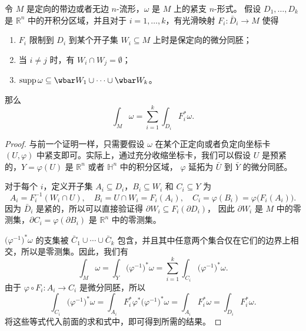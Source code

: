 \begin{proposition}[参数化上的积分]\label{prop:integration on manifold by parametrization}
  令 $M$ 是定向的带边或者无边 $n$-流形，$\omega$ 是 $M$ 上的紧支 $n$-形式。
  假设 $D_1,\dots,D_k$ 是 $\mathbb{R}^n$ 中的开积分区域，并且对于
  $i=1,\dots,k$，有光滑映射 $F_i:\bar D_i\to M$ 使得
  \begin{enumerate}
    \item $F_i$ 限制到 $D_i$ 到某个开子集 $W_i\subseteq M$ 上时是保定向的微分同胚；
    \item 当 $i\neq j$ 时，有 $W_i\cap W_j=\emptyset$；
    \item $\supp\omega\subseteq \wbar W_1\cup\cdots\cup\wbar W_k$。
  \end{enumerate}
  那么
  \begin{equation}
    \int_M\omega=\sum_{i=1}^k \int_{D_i} F_i^*\omega.
  \end{equation}
\end{proposition}
\begin{proof}
  与前一个证明一样，只需要假设 $\omega$ 在某个正定向或者负定向坐标卡
  $(U,\varphi)$ 中紧支即可。实际上，通过充分收缩坐标卡，我们可以假设 $U$
  是预紧的，$Y=\varphi(U)$ 是 $\mathbb{R}^n$ 或者 $\mathbb{H}^n$ 中的积分区域，
  $\varphi$ 延拓为 $\bar U$ 到 $\bar Y$ 的微分同胚。

  对于每个 $i$，定义开子集 $A_i\subseteq D_i$，$B_i\subseteq W_i$ 和 
  $C_i\subseteq Y$ 为 
  \[
    A_i=F_i^{-1}(W_i\cap U),\quad B_i=U\cap W_i=F_i(A_i),
    \quad C_i=\varphi(B_i)=\varphi\bigl(F_i(A_i)\bigr).
  \]
  因为 $\bar D_i$ 是紧的，所以可以直接验证得 $\partial W_i\subseteq F_i(\partial D_i)$，
  因此 $\partial W_i$ 是 $M$ 中的零测集，$\partial C_i=\varphi(\partial B_i)$
  是 $\mathbb{R}^n$ 中的零测集。

  $\bigl(\varphi^{-1}\bigr)^*\omega$ 的支集被 $\bar C_1\cup\cdots\cup \bar C_k$
  包含，并且其中任意两个集合仅在它们的边界上相交，所以是零测集。因此，我们有 
  \[
    \int_M\omega=\int_Y\bigl(\varphi^{-1}\bigr)^*\omega=\sum_{i=1}^k \int_{C_i}\bigl(\varphi^{-1}\bigr)^*\omega.
  \]
  由于 $\varphi\circ F_i:A_i\to C_i$ 是微分同胚，所以
  \[
    \int_{C_i}\bigl(\varphi^{-1}\bigr)^*\omega=\int_{A_i} F_i^*\varphi^*\bigl(\varphi^{-1}\bigr)^*\omega
    =\int_{A_i} F_i^*\omega=\int_{D_i} F_i^*\omega.
  \]
  将这些等式代入前面的求和式中，即可得到所需的结果。
\end{proof}

